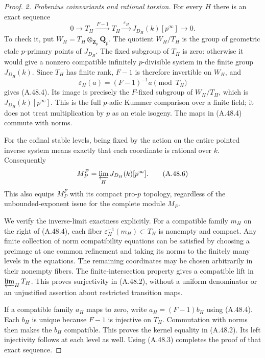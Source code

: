 \documentclass[11pt]{article}
\begin{document}
\begin{proof}
\emph{2. Frobenius coinvariants and rational torsion.}
For every $H$ there is an exact sequence
\[
 0\longrightarrow T_H\xrightarrow{\ F-1\ }T_H
     \xrightarrow{\ \varepsilon_H\ }
       J_{D_H}(k)[p^\infty]\longrightarrow0.
                                                        \tag{A.48.4}
\]
To check it, put $W_H=T_H\otimes_{\mathbf Z_p}\mathbf Q_p$.
The quotient $W_H/T_H$ is the group of geometric
etale $p$-primary points of $J_{D_H}$. The fixed
subgroup of $T_H$ is zero: otherwise it would give
a nonzero compatible infinitely $p$-divisible
system in the finite group $J_{D_H}(k)$.
Since $T_H$ has finite rank, $F-1$ is therefore
invertible on $W_H$, and
\[
 \varepsilon_H(a)=(F-1)^{-1}a\pmod {T_H}
                                                        \tag{A.48.5}
\]
gives (A.48.4). Its image is precisely the
$F$-fixed subgroup of $W_H/T_H$, which is
$J_{D_H}(k)[p^\infty]$. This is the full $p$-adic
Kummer comparison over a finite field; it does not
treat multiplication by $p$ as an etale isogeny.
The maps in (A.48.4) commute with norms.

For the cofinal stable levels, being fixed by the
action on the entire pointed inverse system means
exactly that each coordinate is rational over $k$.
Consequently
\[
           M_P^F=\varprojlim_H J_{D_H}(k)[p^\infty].
                                                        \tag{A.48.6}
\]
This also equips $M_P^F$ with its compact pro-$p$
topology, regardless of the unbounded-exponent issue
for the complete module $M_P$.

We verify the inverse-limit exactness explicitly.
For a compatible family $m_H$ on the right of
(A.48.4), each fiber
$\varepsilon_H^{-1}(m_H)\subset T_H$ is nonempty
and compact. Any finite collection of norm
compatibility equations can be satisfied by choosing
a preimage at one common refinement and taking its
norms to the finitely many levels in the equations.
The remaining coordinates may be chosen arbitrarily
in their nonempty fibers. The finite-intersection
property gives a compatible lift in
$\varprojlim_H T_H$. This proves surjectivity in
(A.48.2), without a uniform denominator or an
unjustified assertion about restricted transition maps.

If a compatible family $a_H$ maps to zero, write
$a_H=(F-1)b_H$ using (A.48.4). Each $b_H$ is
unique because $F-1$ is injective on $T_H$.
Commutation with norms then makes the $b_H$
compatible. This proves the kernel equality in
(A.48.2). Its left injectivity follows at each
level as well. Using (A.48.3) completes the proof
of that exact sequence.


\end{proof}
\end{document}
